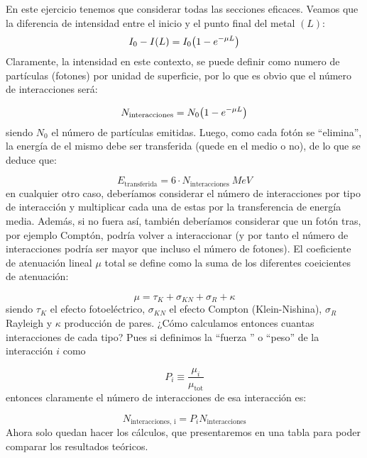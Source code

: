 En este ejercicio tenemos que considerar todas las secciones eficaces. Veamos que la diferencia de intensidad entre el inicio y el punto final del metal $(L)$: 
\begin{equation}
   I_0 - I(L) = I_0 \pqty{1-e^{-\mu L}} 
\end{equation}
Claramente, la intensidad en este contexto, se puede definir como numero de partículas (fotones) por unidad de superficie, por lo que es obvio que el número de interacciones será: 

\begin{equation}
    N_{\text{interacciones}}= N_0 \pqty{1-e^{-\mu L}} 
\end{equation}
siendo $N_0$ el número de partículas emitidas. Luego, como cada fotón se ``elimina'', la energía de el mismo debe ser transferida (quede en el medio o no), de lo que se deduce que: 

\begin{equation}
    E_{\text{transferida}} = 6 \cdot N_{\text{interacciones}}  \ \unit{MeV}
\end{equation}
en cualquier otro caso, deberíamos considerar el número de interacciones por tipo de interacción y multiplicar cada una de estas por la transferencia de energía media. Además, si no fuera así, también deberíamos considerar que un fotón tras, por ejemplo Comptón, podría volver a interaccionar (y por tanto el número de interacciones podría ser mayor que incluso el número de fotones). El coeficiente de atenuación lineal $\mu$ total se define como la suma de los diferentes coeicientes de atenuación: 

\begin{equation}
    \mu = \tau_K + \sigma_{KN} + \sigma_R + \kappa 
\end{equation}
siendo $\tau_K$ el efecto fotoeléctrico, $\sigma_{KN}$ el efecto Compton (Klein-Nishina), $\sigma_R$ Rayleigh y $\kappa$ producción de pares. ¿Cómo calculamos entonces cuantas interacciones de cada tipo? Pues si definimos la ``fuerza '' o ``peso'' de la interacción $i$ como 

\begin{equation}
    P_i \equiv \frac{\mu_i}{\mu_{\text{tot}}}
\end{equation}
entonces claramente el número de interacciones de esa interacción es: 

\begin{equation}
    N_{\text{interacciones, i}} =  P_i N_{\text{interacciones}}
\end{equation}
Ahora solo quedan hacer los cálculos, que presentaremos en una tabla para poder comparar los resultados teóricos. 


